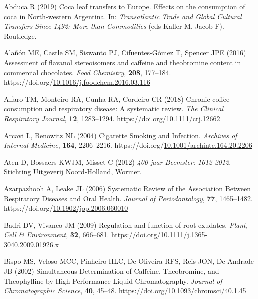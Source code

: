 \documentclass[
  11pt,
  leqno]{scrartcl}
\newlength{\cslhangindent}
\newenvironment{CSLReferences}[2] %
 {\begin{list}{}{%
  \setlength{\itemindent}{0pt}
  \setlength{\leftmargin}{0pt}
  \setlength{\parsep}{0pt}
  \ifodd #1
   \setlength{\leftmargin}{\cslhangindent}
   \setlength{\itemindent}{-1\cslhangindent}
  \fi
  \setlength{\itemsep}{#2\baselineskip}}}
 {\end{list}}
\begin{document}
\label{refs}
\begin{CSLReferences}{1}{0}
Abduca R (2019) \href{https://books.google.com?id=13imDwAAQBAJ}{Coca
leaf transfers to {Europe}. {Effects} on the consumption of coca in
{North-western Argentina}.} In: \emph{Transatlantic {Trade} and {Global
Cultural Transfers Since} 1492: {More} than {Commodities}} (eds Kaller
M, Jacob F). {Routledge}.

Alañón ME, Castle SM, Siswanto PJ, Cifuentes-Gómez T, Spencer JPE (2016)
Assessment of flavanol stereoisomers and caffeine and theobromine
content in commercial chocolates. \emph{Food Chemistry}, \textbf{208},
177--184.
https://doi.org/\href{https://doi.org/10.1016/j.foodchem.2016.03.116}{10.1016/j.foodchem.2016.03.116}

Alfaro TM, Monteiro RA, Cunha RA, Cordeiro CR (2018) Chronic coffee
consumption and respiratory disease: {A} systematic review. \emph{The
Clinical Respiratory Journal}, \textbf{12}, 1283--1294.
https://doi.org/\href{https://doi.org/10.1111/crj.12662}{10.1111/crj.12662}

Arcavi L, Benowitz NL (2004) Cigarette {Smoking} and {Infection}.
\emph{Archives of Internal Medicine}, \textbf{164}, 2206--2216.
https://doi.org/\href{https://doi.org/10.1001/archinte.164.20.2206}{10.1001/archinte.164.20.2206}

Aten D, Bossaers KWJM, Misset C (2012) \emph{400 jaar Beemster:
1612-2012}. {Stichting Uitgeverij Noord-Holland}, {Wormer}.

Azarpazhooh A, Leake JL (2006) Systematic {Review} of the {Association
Between Respiratory Diseases} and {Oral Health}. \emph{Journal of
Periodontology}, \textbf{77}, 1465--1482.
https://doi.org/\href{https://doi.org/10.1902/jop.2006.060010}{10.1902/jop.2006.060010}

Badri DV, Vivanco JM (2009) Regulation and function of root exudates.
\emph{Plant, Cell \& Environment}, \textbf{32}, 666--681.
https://doi.org/\href{https://doi.org/10.1111/j.1365-3040.2009.01926.x}{10.1111/j.1365-3040.2009.01926.x}

Bispo MS, Veloso MCC, Pinheiro HLC, De Oliveira RFS, Reis JON, De
Andrade JB (2002) Simultaneous {Determination} of {Caffeine},
{Theobromine}, and {Theophylline} by {High-Performance Liquid
Chromatography}. \emph{Journal of Chromatographic Science}, \textbf{40},
45--48.
https://doi.org/\href{https://doi.org/10.1093/chromsci/40.1.45}{10.1093/chromsci/40.1.45}


\end{CSLReferences}
\end{document}
